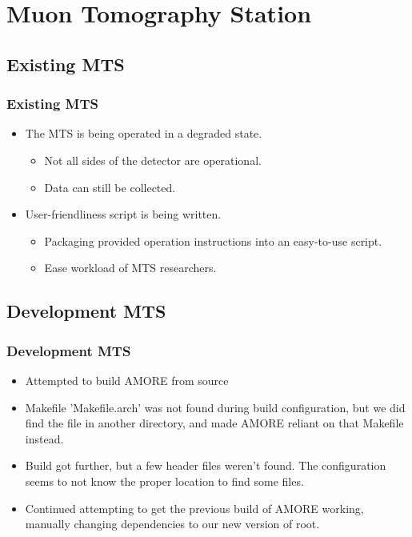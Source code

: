 \documentclass[aspectratio=169]{beamer}
\begin{document}
\section{Muon Tomography Station}


\subsection{Existing MTS}

\begin{frame}

  \frametitle{Existing MTS}

  \begin{itemize}
  \item The MTS is being operated in a degraded state.
    \begin{itemize}
    \item Not all sides of the detector are operational.
    \item Data can still be collected.
    \end{itemize}
  \item User-friendliness script is being written.
    \begin{itemize}
    \item Packaging provided operation instructions into an easy-to-use
      script.
    \item Ease workload of MTS researchers.
    \end{itemize}
  \end{itemize}

\end{frame}



\subsection{Development MTS}

\begin{frame}

  \frametitle{Development MTS}

  \begin{itemize}
    \item Attempted to build AMORE from source
    \item Makefile 'Makefile.arch' was not found during build configuration, but
      we did find the file in another directory, and made AMORE reliant on that
      Makefile instead.
    \item Build got further, but a few header files weren't found. The
      configuration seems to not know the proper location to find some files.
    \item Continued attempting to get the previous build of AMORE working,
    	  manually changing dependencies to our new version of root.
  \end{itemize}

\end{frame}
\end{document}
